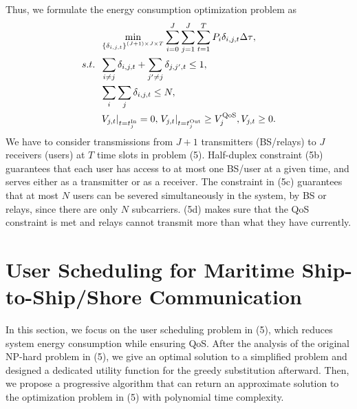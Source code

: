 \documentclass[journal]{IEEEtran}
\begin{document}
   Thus, we formulate the energy consumption optimization problem as
   \begin{subequations}
   \begin{align}
   & \mathop {\min }\limits_{{\left\{ {{\delta _{i,j,t}}} \right\}^{\left( {J + 1} \right) \times J \times T}}}  {\sum\limits_{i = 0}^J {\sum\limits_{j = 1}^J {\sum\limits_{t = 1}^{T} {{P_{i}}\delta _{i,j,t} \Delta \tau } } } }  ,\\
    {s.t.} \;\; &\sum\limits_{i \ne j} {{{\delta _{i,j,t}}} } + \sum\limits_{j' \ne j} { {{\delta _{j,j',t}}} \le {1}} ,\\
    \;\;\;\;\;\; &\sum\limits_i {\sum\limits_j { {{\delta _{i,j,t}}} } } \le N ,\\
    \;\;\;\;\;\; &{{{\left. {{V_{j,t}}} \right|}_{t = t_j^{{\rm{In}}}}} = 0, \left. {{V_{j,t}}} \right|_{t = t_j^{{\rm{Out}}}}} \ge V_j^{\rm{QoS}}, {V_{j,t}} \ge 0.
   \end{align}
   \end{subequations}
   We have to consider transmissions from ${J + 1}$ transmitters (BS/relays) to $J$ receivers (users) at $T$ time slots in problem (5). 
   Half-duplex constraint (5b) guarantees that each user has access to at most one BS/user at a given time, and serves either as a transmitter or as a receiver. The constraint in (5c) guarantees that at most $N$ users can be severed simultaneously in the system, by BS or relays, since there are only $N$ subcarriers. (5d) makes sure that the QoS constraint is met and relays cannot transmit more than what they have currently.
   
   
   
   \section{User Scheduling for Maritime Ship-to-Ship/Shore Communication}\label{sec:3}
   
   In this section, we focus on the user scheduling problem in (5), which reduces system energy consumption while ensuring QoS. After the analysis of the original NP-hard problem in (5), we give an optimal solution to a simplified problem and designed a dedicated utility function for the greedy substitution afterward. Then, we propose a progressive algorithm that can return an approximate solution to the optimization problem in (5) with polynomial time complexity. 
   
\end{document}
